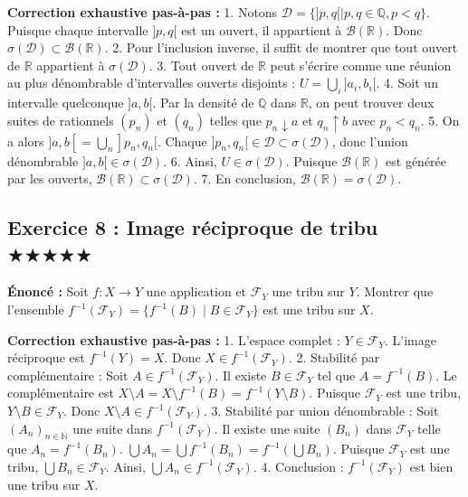 \documentclass[11pt,a4paper]{article}
\begin{document}
\textbf{Correction exhaustive pas-à-pas :}
1. Notons $\mathcal{D} = \{ ]p, q[ \mid p, q \in \mathbb{Q}, p < q \}$. Puisque chaque intervalle $]p, q[$ est un ouvert, il appartient à $\mathcal{B}(\mathbb{R})$. Donc $\sigma(\mathcal{D}) \subset \mathcal{B}(\mathbb{R})$.
2. Pour l'inclusion inverse, il suffit de montrer que tout ouvert de $\mathbb{R}$ appartient à $\sigma(\mathcal{D})$.
3. Tout ouvert de $\mathbb{R}$ peut s'écrire comme une réunion au plus dénombrable d'intervalles ouverts disjoints : $U = \bigcup_{i} ]a_i, b_i[$.
4. Soit un intervalle quelconque $]a, b[$. Par la densité de $\mathbb{Q}$ dans $\mathbb{R}$, on peut trouver deux suites de rationnels $(p_n)$ et $(q_n)$ telles que $p_n \downarrow a$ et $q_n \uparrow b$ avec $p_n < q_n$.
5. On a alors $]a, b[ = \bigcup_{n} ]p_n, q_n[$. Chaque $]p_n, q_n[ \in \mathcal{D} \subset \sigma(\mathcal{D})$, donc l'union dénombrable $]a, b[ \in \sigma(\mathcal{D})$.
6. Ainsi, $U \in \sigma(\mathcal{D})$. Puisque $\mathcal{B}(\mathbb{R})$ est générée par les ouverts, $\mathcal{B}(\mathbb{R}) \subset \sigma(\mathcal{D})$.
7. En conclusion, $\mathcal{B}(\mathbb{R}) = \sigma(\mathcal{D})$.



\subsection*{Exercice 8 : Image réciproque de tribu \quad $\bigstar\bigstar\bigstar\bigstar\bigstar$}


\textbf{Énoncé :}
Soit $f : X \to Y$ une application et $\mathcal{F}_Y$ une tribu sur $Y$. Montrer que l'ensemble $f^{-1}(\mathcal{F}_Y) = \{f^{-1}(B) \mid B \in \mathcal{F}_Y\}$ est une tribu sur $X$.

\textbf{Correction exhaustive pas-à-pas :}
1. L'espace complet : $Y \in \mathcal{F}_Y$. L'image réciproque est $f^{-1}(Y) = X$. Donc $X \in f^{-1}(\mathcal{F}_Y)$.
2. Stabilité par complémentaire : Soit $A \in f^{-1}(\mathcal{F}_Y)$. Il existe $B \in \mathcal{F}_Y$ tel que $A = f^{-1}(B)$.
   Le complémentaire est $X \setminus A = X \setminus f^{-1}(B) = f^{-1}(Y \setminus B)$.
   Puisque $\mathcal{F}_Y$ est une tribu, $Y \setminus B \in \mathcal{F}_Y$. Donc $X \setminus A \in f^{-1}(\mathcal{F}_Y)$.
3. Stabilité par union dénombrable : Soit $(A_n)_{n \in \mathbb{N}}$ une suite dans $f^{-1}(\mathcal{F}_Y)$. Il existe une suite $(B_n)$ dans $\mathcal{F}_Y$ telle que $A_n = f^{-1}(B_n)$.
   $\bigcup A_n = \bigcup f^{-1}(B_n) = f^{-1}(\bigcup B_n)$.
   Puisque $\mathcal{F}_Y$ est une tribu, $\bigcup B_n \in \mathcal{F}_Y$. Ainsi, $\bigcup A_n \in f^{-1}(\mathcal{F}_Y)$.
4. Conclusion : $f^{-1}(\mathcal{F}_Y)$ est bien une tribu sur $X$.
\end{document}

